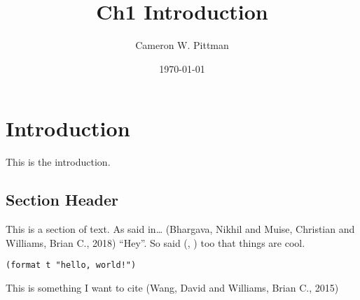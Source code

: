\documentclass[11pt]{article}
\author{Cameron W. Pittman}
\date{\today}
\title{Ch1 Introduction}
\begin{document}
\maketitle
\tableofcontents


\section{Introduction}
\label{sec:org0505fc1}

This is the introduction.

\subsection{Section Header}
\label{sec:org250102f}

This is a section of text. As said in\ldots{} (Bhargava, Nikhil and Muise, Christian and Williams, Brian C., 2018) ``Hey''. So said (, ) too
that things are cool.

\begin{verbatim}
(format t "hello, world!")
\end{verbatim}

This is something I want to cite (Wang, David and Williams, Brian C., 2015)
\end{document}
